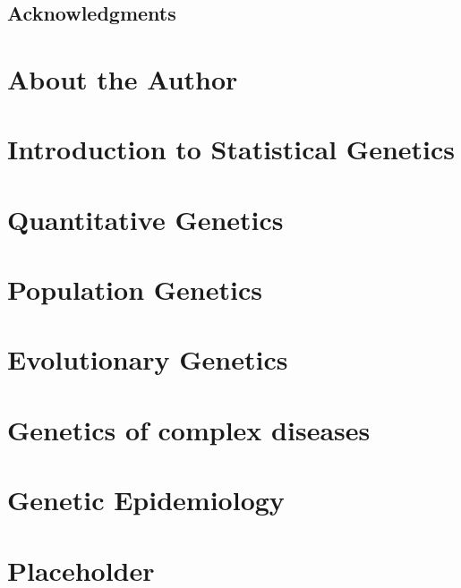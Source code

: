 \documentclass[12pt,]{book}
\begin{document}
\section*{Acknowledgments}\label{acknowledgments}

\chapter*{About the Author}\label{about-the-author}

\chapter{Introduction to Statistical
Genetics}\label{introduction-to-statistical-genetics}

\chapter{Quantitative Genetics}\label{quantitative-genetics}

\chapter{Population Genetics}\label{population-genetics}

\chapter{Evolutionary Genetics}\label{evolutionary-genetics}

\chapter{Genetics of complex
diseases}\label{genetics-of-complex-diseases}

\chapter{Genetic Epidemiology}\label{genetic-epidemiology}

\chapter{Placeholder}\label{placeholder}
\end{document}
